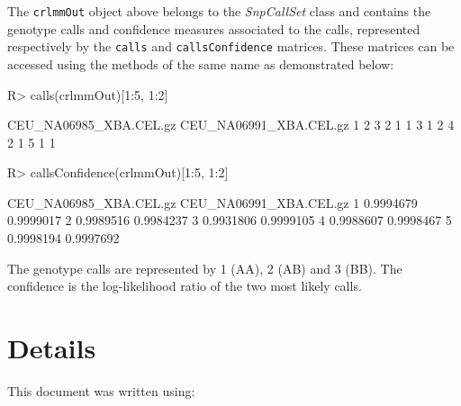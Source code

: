 \documentclass{article}
\newcommand{\Robject}[1]{{\texttt{#1}}}
\newcommand{\Rclass}[1]{{\textit{#1}}}
\begin{document}
The \Robject{crlmmOut} object above belongs to the \Rclass{SnpCallSet}
class and contains the genotype calls and confidence measures
associated to the calls, represented respectively by the
\Robject{calls} and \Robject{callsConfidence} matrices. These matrices
can be accessed using the methods of the same name as demonstrated
below:

\begin{Schunk}
\begin{Sinput}
R> calls(crlmmOut)[1:5, 1:2]
\end{Sinput}
\begin{Soutput}
  CEU_NA06985_XBA.CEL.gz CEU_NA06991_XBA.CEL.gz
1                      2                      3
2                      1                      1
3                      1                      2
4                      2                      1
5                      1                      1
\end{Soutput}
\begin{Sinput}
R> callsConfidence(crlmmOut)[1:5, 1:2]
\end{Sinput}
\begin{Soutput}
  CEU_NA06985_XBA.CEL.gz CEU_NA06991_XBA.CEL.gz
1              0.9994679              0.9999017
2              0.9989516              0.9984237
3              0.9931806              0.9999105
4              0.9988607              0.9998467
5              0.9998194              0.9997692
\end{Soutput}
\end{Schunk}

The genotype calls are represented by 1 (AA), 2 (AB) and 3 (BB). The
confidence is the log-likelihood ratio of the two most likely calls.
 
\section{Details}

This document was written using:
\end{document}
